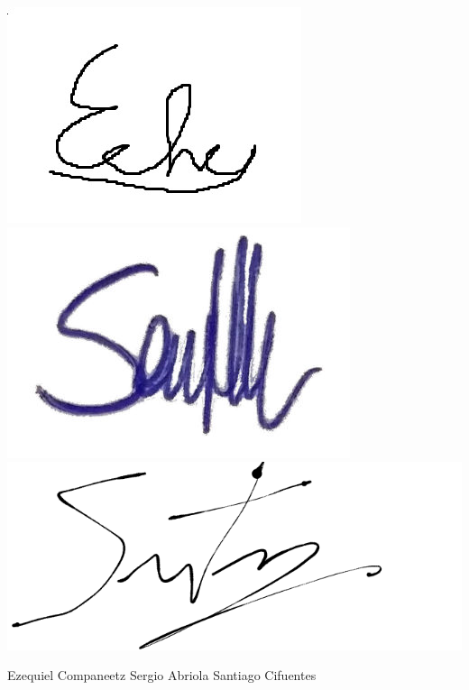 \documentclass[10pt,a4paper]{article}
\begin{document}
\includegraphics[scale=0.2]{firmas/Echu_firma.jpg} \hspace{2,7cm} \includegraphics[scale=0.2]{firmas/Firma_Sergiob.jpg} \hspace{2,3cm}  \includegraphics[scale=0.2]{firmas/Cifuentes_Firma.png} \hspace{2,3cm}%

\hspace{0.2cm}Ezequiel Companeetz \hspace{2,3cm} Sergio Abriola  \hspace{2,3cm} Santiago Cifuentes
\end{document}
